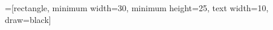 \newcommand{\keta}[2][]{\vert {#2} \rangle_{#1}}
\newcommand{\braketa}[3][]{\langle {#2} \vert {#3}\rangle_{#1}}

=[rectangle, minimum width=30, minimum height=25, text width=10, draw=black]

